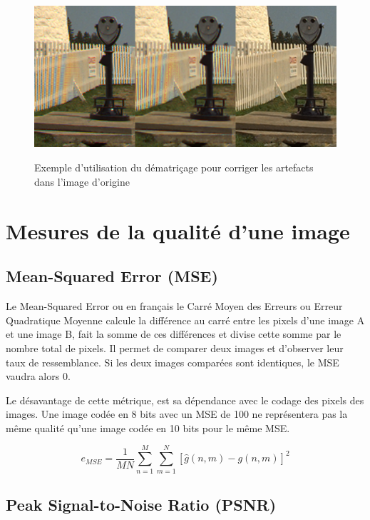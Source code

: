 \documentclass[]{article}
\begin{document}
\begin{figure}
\centering
\includegraphics[height=6cm]{img/demosaic.png}
\caption{Exemple d'utilisation du dématriçage pour corriger les
artefacts dans l'image d'origine}
\end{figure}

\newpage

\hypertarget{mesures-de-la-qualituxe9-dune-image}{%
\section{Mesures de la qualité d'une
image}\label{mesures-de-la-qualituxe9-dune-image}}

\hypertarget{mean-squared-error-mse}{%
\subsection{Mean-Squared Error (MSE)}\label{mean-squared-error-mse}}

Le Mean-Squared Error ou en français le Carré Moyen des Erreurs ou
Erreur Quadratique Moyenne calcule la différence au carré entre les
pixels d'une image A et une image B, fait la somme de ces différences et
divise cette somme par le nombre total de pixels. Il permet de comparer
deux images et d'observer leur taux de ressemblance. Si les deux images
comparées sont identiques, le MSE vaudra alors \(0\).

Le désavantage de cette métrique, est sa dépendance avec le codage des
pixels des images. Une image codée en 8 bits avec un MSE de 100 ne
représentera pas la même qualité qu'une image codée en 10 bits pour le
même MSE.

\[e_{MSE} = \frac{1}{M N} \sum_{n=1}^{M} \sum_{m=1}^{N}[\hat{g}(n, m) - g(n, m)]^2\]

\hypertarget{peak-signal-to-noise-ratio-psnr}{%
\subsection{Peak Signal-to-Noise Ratio
(PSNR)}\label{peak-signal-to-noise-ratio-psnr}}
\end{document}
